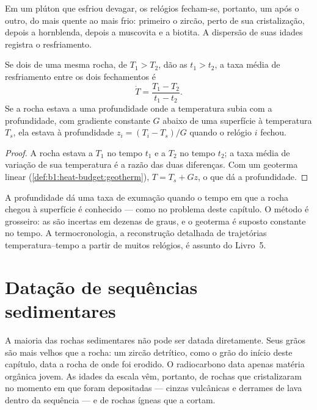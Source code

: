 Em um plúton que esfriou devagar, os relógios fecham-se, portanto, um após o outro, do mais
quente ao mais frio: primeiro o zircão, perto de sua cristalização, depois a hornblenda, depois a
muscovita e a biotita. A dispersão de suas idades registra o resfriamento.

\begin{proposition}\label{prop:b1:radiometric-methods:cooling}
Se dois  de uma mesma rocha, de  $T_1 > T_2$, dão as  $t_1 > t_2$, a taxa média de resfriamento entre os dois fechamentos é
\[
  \dot T = \frac{T_1 - T_2}{t_1 - t_2}.
\]
Se a rocha estava a uma profundidade onde a temperatura subia com a profundidade, com gradiente
constante $G$ abaixo de uma superfície à temperatura $T_s$, ela estava à profundidade $z_i
= (T_i - T_s)/G$ quando o relógio $i$ fechou.
\end{proposition}

\begin{proof}
A rocha estava a $T_1$ no tempo $t_1$ e a $T_2$ no tempo $t_2$; a taxa média de variação de sua
temperatura é a razão das duas diferenças. Com um geoterma linear
(\cref{def:b1:heat-budget:geotherm}), $T = T_s + G z$, o que dá a profundidade.
\end{proof}

A profundidade dá uma taxa de exumação quando o tempo em que a rocha chegou à superfície é
conhecido --- como no problema deste capítulo. O método é grosseiro: as  são incertas em dezenas de graus, e o geoterma é suposto constante no tempo. A
termocronologia, a reconstrução detalhada de trajetórias temperatura--tempo a partir de muitos
relógios, é assunto do Livro~5.

\section{Datação de sequências sedimentares}\label{sec:b1:radiometric-methods:sediments}

A maioria das rochas sedimentares não pode ser datada diretamente. Seus grãos são mais velhos
que a rocha: um zircão detrítico, como o grão do início deste capítulo, data a rocha de onde foi
erodido. O radiocarbono data apenas matéria orgânica jovem. As idades da escala vêm, portanto, de
rochas que cristalizaram no momento em que foram depositadas --- cinzas vulcânicas e derrames de
lava dentro da sequência --- e de rochas ígneas que a cortam.


